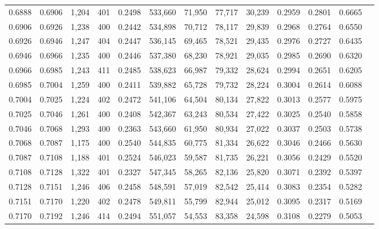 \begin{tabular}{rrrrrrrrrrrrr}
0.6888 & 0.6906 & 1,204 & 401 &                                     0.2498 & 533,660 &  71,950 &  77,717 &  30,239 & 0.2959 & 0.2801 & 0.6665 \\
0.6906 & 0.6926 & 1,238 & 400 &                                     0.2442 & 534,898 &  70,712 &  78,117 &  29,839 & 0.2968 & 0.2764 & 0.6550 \\
0.6926 & 0.6946 & 1,247 & 404 &                                     0.2447 & 536,145 &  69,465 &  78,521 &  29,435 & 0.2976 & 0.2727 & 0.6435 \\
0.6946 & 0.6966 & 1,235 & 400 &                                     0.2446 & 537,380 &  68,230 &  78,921 &  29,035 & 0.2985 & 0.2690 & 0.6320 \\
0.6966 & 0.6985 & 1,243 & 411 &                                     0.2485 & 538,623 &  66,987 &  79,332 &  28,624 & 0.2994 & 0.2651 & 0.6205 \\
0.6985 & 0.7004 & 1,259 & 400 &                                     0.2411 & 539,882 &  65,728 &  79,732 &  28,224 & 0.3004 & 0.2614 & 0.6088 \\
0.7004 & 0.7025 & 1,224 & 402 &                                     0.2472 & 541,106 &  64,504 &  80,134 &  27,822 & 0.3013 & 0.2577 & 0.5975 \\
0.7025 & 0.7046 & 1,261 & 400 &                                     0.2408 & 542,367 &  63,243 &  80,534 &  27,422 & 0.3025 & 0.2540 & 0.5858 \\
0.7046 & 0.7068 & 1,293 & 400 &                                     0.2363 & 543,660 &  61,950 &  80,934 &  27,022 & 0.3037 & 0.2503 & 0.5738 \\
0.7068 & 0.7087 & 1,175 & 400 &                                     0.2540 & 544,835 &  60,775 &  81,334 &  26,622 & 0.3046 & 0.2466 & 0.5630 \\
0.7087 & 0.7108 & 1,188 & 401 &                                     0.2524 & 546,023 &  59,587 &  81,735 &  26,221 & 0.3056 & 0.2429 & 0.5520 \\
0.7108 & 0.7128 & 1,322 & 401 &                                     0.2327 & 547,345 &  58,265 &  82,136 &  25,820 & 0.3071 & 0.2392 & 0.5397 \\
0.7128 & 0.7151 & 1,246 & 406 &                                     0.2458 & 548,591 &  57,019 &  82,542 &  25,414 & 0.3083 & 0.2354 & 0.5282 \\
0.7151 & 0.7170 & 1,220 & 402 &                                     0.2478 & 549,811 &  55,799 &  82,944 &  25,012 & 0.3095 & 0.2317 & 0.5169 \\
0.7170 & 0.7192 & 1,246 & 414 &                                     0.2494 & 551,057 &  54,553 &  83,358 &  24,598 & 0.3108 & 0.2279 & 0.5053 \\

\end{tabular}
